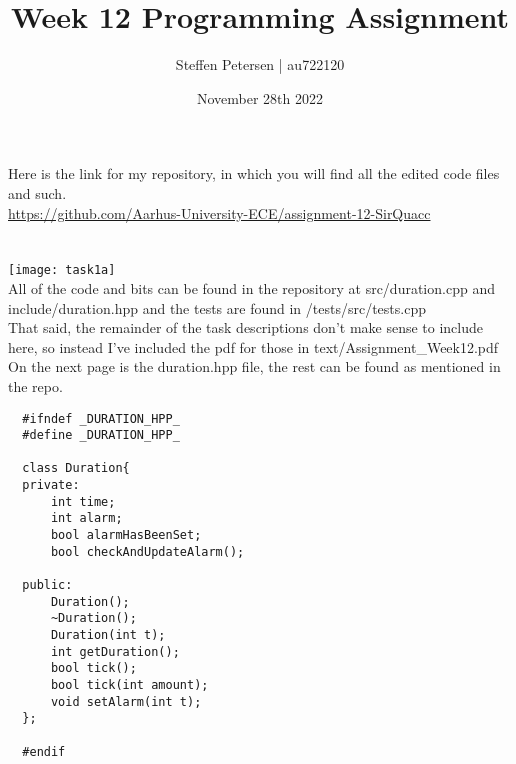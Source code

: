 \documentclass{article}
\title{Week 12 Programming Assignment}
\author{Steffen Petersen | au722120}
\date{November 28th 2022}
\begin{document}

\maketitle
\vspace{5pt}
\noindent Here is the link for my repository, in which you will find all the edited code files and such.\\
\url{https://github.com/Aarhus-University-ECE/assignment-12-SirQuacc}
\section{}
\texttt{[image: task1a]}
\vspace{2pt}\\
All of the code and bits can be found in the repository at src/duration.cpp and include/duration.hpp and the tests are found in /tests/src/tests.cpp\\
That said, the remainder of the task descriptions don't make sense to include here, so instead I've included the pdf for those
in text/Assignment\_Week12.pdf
\\

\noindent On the next page is the duration.hpp file, the rest can be found as mentioned in the repo.
\pagebreak
\begin{lstlisting}
  #ifndef _DURATION_HPP_
  #define _DURATION_HPP_
  
  class Duration{
  private:
      int time;
      int alarm;
      bool alarmHasBeenSet;
      bool checkAndUpdateAlarm();
  
  public:
      Duration();
      ~Duration();
      Duration(int t);
      int getDuration();
      bool tick();
      bool tick(int amount);
      void setAlarm(int t);
  };
  
  #endif
\end{lstlisting}
\end{document}
